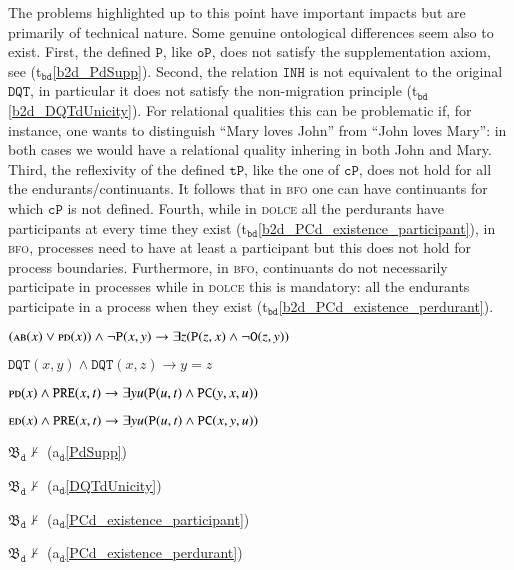 \documentclass[ao]{iosart2x}
\newcommand{\bflist}{\begin{list}{}{\setlength{\topsep}{2mm}\setlength{\parsep}{0mm}\setlength{\leftmargin}{9.2mm}\setlength{\labelwidth}{8mm}}}
\newcommand{\eflist}{\end{list}}
\newcommand{\dolceAxLabel}{\textrm{a$_\texttt{d}$}}
\newcommand{\bdThrLabel}{\textrm{t$_\texttt{bd}$}}
\newcounter{cntax}
\newcommand{\dolceax}[1]{\refstepcounter{cntax}\begin{small}{\bf \dolceAxLabel\thecntax\label{#1}}\end{small}}
\newcounter{cntbdth}
\newcommand{\bdth}[1]{\refstepcounter{cntbdth}\begin{small}{\bf \bdThrLabel\thecntbdth\label{#1}}\end{small}}
\newcommand{\refdolceax}[1]{({\dolceAxLabel}\ref{#1})}
\newcommand{\refbdth}[1]{({\bdThrLabel}\ref{#1})}
\newcommand{\pr}[1]{\mathtt{#1}}
\newcommand{\dolce}{{\textsc{dolce}}}
\newcommand{\bfo}{{\textsc{bfo}}}
\newcommand {\thbfobdmap} {\ensuremath{\mathfrak{B}_\texttt{d}}}
\newcommand {\ABdcat} {\textsc{ab}}
\newcommand {\EDdcat} {\textsc{ed}}
\newcommand {\PDdcat} {\textsc{pd}}
\newcommand {\TPd} {\ensuremath{\pr{tP}}}
\newcommand {\Pd} {\ensuremath{\pr{P}}}
\newcommand {\Od} {\ensuremath{\pr{O}}}
\newcommand {\PREd} {\ensuremath{\pr{PRE}}}
\newcommand {\DQTd} {\ensuremath{\pr{DQT}}}
\newcommand {\PCd} {\ensuremath{\pr{PC}}}
\newcommand{\bfocpart}{\pr{cP}}
\newcommand{\bfoopart}{\pr{oP}}
\newcommand{\bfoinh}{\pr{INH}}
\begin{document}
The problems highlighted up to this point have important impacts but are primarily of technical nature. Some genuine ontological differences seem also to exist. First, the defined $\Pd$, like $\bfoopart$, does not satisfy the supplementation axiom, see \refbdth{b2d_PdSupp}. Second, the relation $\bfoinh$ is not equivalent to the original $\DQTd$, in particular it does not satisfy the non-migration principle \refbdth{b2d_DQTdUnicity}. For relational qualities this can be problematic if, for instance, one wants to distinguish ``Mary loves John'' from ``John loves Mary'': in both cases we would have a relational quality inhering in both John and Mary. Third, the reflexivity of the defined $\TPd$, like the one of $\bfocpart$, does not hold for all the endurants/continuants. It follows that in {\bfo} one can have continuants for which $\bfocpart$ is not defined.  Fourth, while in {\dolce} all the perdurants have participants at every time they exist \refbdth{b2d_PCd_existence_participant}, in {\bfo}, processes need to have at least a participant but this does not hold for process boundaries. Furthermore, in {\bfo}, continuants do not necessarily participate in processes while in {\dolce} this is mandatory: all the endurants participate in a process when they exist \refbdth{b2d_PCd_existence_perdurant}.
%
\bflist
\item[\dolceax{PdSupp}] $(\ABdcat(x) \lor \PDdcat(x)) \land \neg\Pd(x,y) \to \exists z (\Pd(z,x) \land \neg \Od(z,y))$ 

\item[\dolceax{DQTdUnicity}] $\DQTd(x,y) \land \DQTd(x,z) \to y=z$ 

\item[\dolceax{PCd_existence_participant}] $\PDdcat(x) \land \PREd(x,t) \to \exists yu(\Pd(u,t) \land \PCd(y,x,u))$ 

\item[\dolceax{PCd_existence_perdurant}] $\EDdcat(x) \land \PREd(x,t) \to \exists yu (\Pd(u,t) \land \PCd(x,y,u))$ 

\item[\bdth{b2d_PdSupp}] $\thbfobdmap \nvdash $ {\refdolceax{PdSupp}} 

\item[\bdth{b2d_DQTdUnicity}] $\thbfobdmap \nvdash $ {\refdolceax{DQTdUnicity}} 

\item[\bdth{b2d_PCd_existence_participant}] $\thbfobdmap \nvdash $ {\refdolceax{PCd_existence_participant}} 

\item[\bdth{b2d_PCd_existence_perdurant}] $\thbfobdmap \nvdash $ {\refdolceax{PCd_existence_perdurant}} 
\eflist
\end{document}

